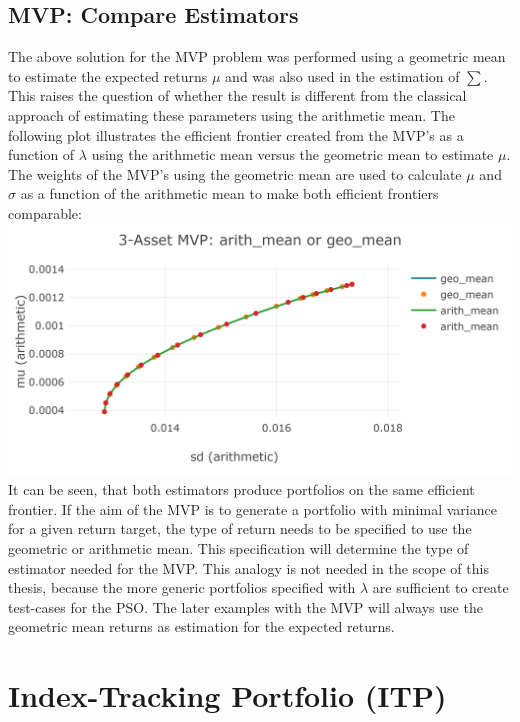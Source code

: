 \documentclass[
  oneside]{book}
\begin{document}
\hypertarget{mvp-compare-estimators}{%
\subsection{MVP: Compare Estimators}\label{mvp-compare-estimators}}

The above solution for the MVP problem was performed using a geometric mean to estimate the expected returns \(\mu\) and was also used in the estimation of \(\textstyle\sum\). This raises the question of whether the result is different from the classical approach of estimating these parameters using the arithmetic mean. The following plot illustrates the efficient frontier created from the MVP's as a function of \(\lambda\) using the arithmetic mean versus the geometric mean to estimate \(\mu\). The weights of the MVP's using the geometric mean are used to calculate \(\mu\) and \(\sigma\) as a function of the arithmetic mean to make both efficient frontiers comparable:
\includegraphics{Master_Thesis_files/figure-latex/unnamed-chunk-4-1.png}
It can be seen, that both estimators produce portfolios on the same efficient frontier. If the aim of the MVP is to generate a portfolio with minimal variance for a given return target, the type of return needs to be specified to use the geometric or arithmetic mean. This specification will determine the type of estimator needed for the MVP. This analogy is not needed in the scope of this thesis, because the more generic portfolios specified with \(\lambda\) are sufficient to create test-cases for the PSO. The later examples with the MVP will always use the geometric mean returns as estimation for the expected returns.

\hypertarget{index-tracking-portfolio-itp}{%
\section{Index-Tracking Portfolio (ITP)}\label{index-tracking-portfolio-itp}}
\end{document}
